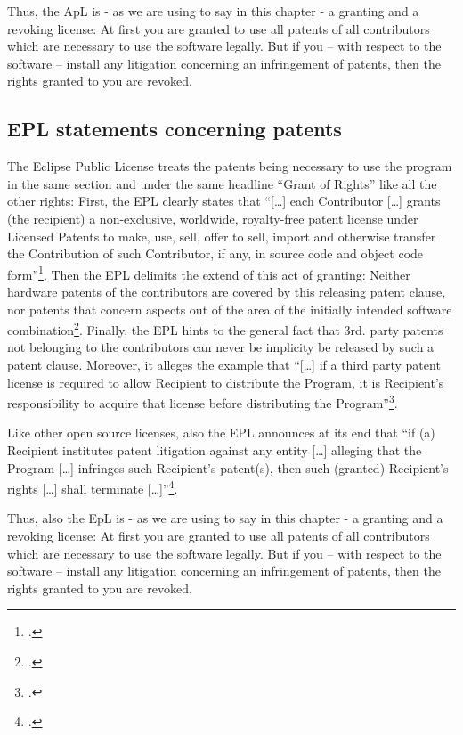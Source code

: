 Thus, the ApL is - as we are using to say in this chapter - a granting and a
revoking license: At first you are granted to use all patents of all
contributors which are necessary to use the software legally. But if you -- with
respect to the software -- install any litigation concerning an infringement of
patents, then the rights granted to you are revoked.


\subsection{EPL statements concerning patents}\label{subsec:EpLPatentClause}

The Eclipse Public License treats the patents being necessary to use the program
in the same section and under the same headline \enquote{Grant of Rights} like
all the other rights: First, the EPL clearly states that \enquote{[\ldots] each
Contributor [\ldots] grants (the recipient) a non-exclusive, worldwide,
royalty-free patent license under Licensed Patents to make, use, sell, offer to
sell, import and otherwise transfer the Contribution of such Contributor, if
any, in source code and object code form}\footcite[cf.][\nopage wp.
§2.b]{Epl10OsiLicense2005a}. Then the EPL delimits the extend of this act of
granting: Neither hardware patents of the contributors are covered by this
releasing patent clause, nor patents that concern aspects out of the area of the
initially intended software combination\footcite[cf.][\nopage wp.
§2.b]{Epl10OsiLicense2005a}. Finally, the EPL hints to the general fact that
3rd. party patents not belonging to the contributors can never be implicity be
released by such a patent clause. Moreover, it alleges the example that
\enquote{[\ldots] if a third party patent license is required to allow Recipient
to distribute the Program, it is Recipient's responsibility to acquire that
license before distributing the Program}\footcite[cf.][\nopage wp.
§2.c]{Epl10OsiLicense2005a}.

Like other open source licenses, also the EPL announces at its end that
\enquote{if (a) Recipient institutes patent litigation against any entity
[\ldots] alleging that the Program [\ldots] infringes such Recipient's
patent(s), then such (granted) Recipient's rights [\ldots] shall terminate
[\ldots]}\footcite[cf.][\nopage wp. §7]{Epl10OsiLicense2005a}.

Thus, also the EpL is - as we are using to say in this chapter - a granting and
a revoking license: At first you are granted to use all patents of all
contributors which are necessary to use the software legally. But if you -- with
respect to the software -- install any litigation concerning an infringement of
patents, then the rights granted to you are revoked.


